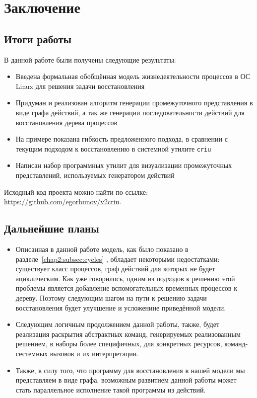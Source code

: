 

\chapter{Заключение}

\section{Итоги работы}

В данной работе были получены следующие результаты:

\begin{itemize}
	\item Введена формальная обобщённая модель жизнедеятельности процессов в ОС Linux для решения задачи восстановления
	\item Придуман и реализован алгоритм генерации промежуточного представления в виде графа действий, а так
	же генерации последовательности действий для восстановления дерева процессов
	\item На примере показана гибкость предложенного подхода, в сравнении с текущим подходом к восстановлению в системной утилите \texttt{criu}
	\item Написан набор программных утилит для визуализации промежуточных представлений, используемых генератором действий
\end{itemize}

Исходный код проекта можно найти по ссылке: \url{https://github.com/egorbunov/v2criu}.

\section{Дальнейшие планы}

\begin{itemize}
	\item Описанная в данной работе модель, как было показано в разделе~\ref{chap2:subsec:cycles}
	, обладает некоторыми недостатками: существует класс процессов, граф действий для которых не 
	будет ациклическим. Как уже говорилось, одним из подходов к решению 
	этой проблемы является добавление вспомогательных временных процессов к дереву. Поэтому
	следующим шагом на пути к решению задачи восстановления будет улучшение и усложенине приведённой модели.
	\item Следующим логичным продолжением данной работы, также, будет реализация раскрытия абстрактных команд, генерируемых реализованным решением, в наборы более специфичных, для конкретных ресурсов, команд-сестемных вызовов и их интерпретации.
	\item Также, в силу того, что программу для восстановления в нашей модели мы представляем в виде графа, возможным развитием данной работы может стать параллельное исполнение такой программы из действий.
\end{itemize}
